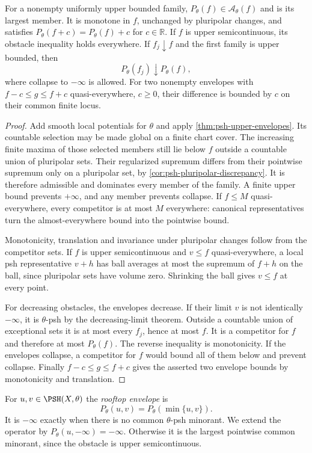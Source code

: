\begin{proposition}\label{prop:obstacle-envelope-maximal-member}
For a nonempty uniformly upper bounded family, $P_\theta(f)\in\mathcal A_\theta(f)$ and is its largest member. It is monotone in $f$, unchanged by pluripolar changes, and satisfies $P_\theta(f+c)=P_\theta(f)+c$ for $c\in\mathbb R$. If $f$ is upper semicontinuous, its obstacle inequality holds everywhere. If $f_j\downarrow f$ and the first family is upper bounded, then
\[
 P_\theta(f_j)\downarrow P_\theta(f),
\]
where collapse to $-\infty$ is allowed. For two nonempty envelopes with $f-c\leq g\leq f+c$ quasi-everywhere, $c\geq0$, their difference is bounded by $c$ on their common finite locus.
\end{proposition}
\begin{proof}
Add smooth local potentials for $\theta$ and apply \cref{thm:psh-upper-envelopes}. Its countable selection may be made global on a finite chart cover. The increasing finite maxima of those selected members still lie below $f$ outside a countable union of pluripolar sets. Their regularized supremum differs from their pointwise supremum only on a pluripolar set, by \cref{cor:psh-pluripolar-discrepancy}. It is therefore admissible and dominates every member of the family. A finite upper bound prevents $+\infty$, and any member prevents collapse. If $f\leq M$ quasi-everywhere, every competitor is at most $M$ everywhere: canonical representatives turn the almost-everywhere bound into the pointwise bound.

Monotonicity, translation and invariance under pluripolar changes follow from the competitor sets. If $f$ is upper semicontinuous and $v\leq f$ quasi-everywhere, a local psh representative $v+h$ has ball averages at most the supremum of $f+h$ on the ball, since pluripolar sets have volume zero. Shrinking the ball gives $v\leq f$ at every point.

For decreasing obstacles, the envelopes decrease. If their limit $v$ is not identically $-\infty$, it is $\theta$-psh by the decreasing-limit theorem. Outside a countable union of exceptional sets it is at most every $f_j$, hence at most $f$. It is a competitor for $f$ and therefore at most $P_\theta(f)$. The reverse inequality is monotonicity. If the envelopes collapse, a competitor for $f$ would bound all of them below and prevent collapse. Finally $f-c\leq g\leq f+c$ gives the asserted two envelope bounds by monotonicity and translation.
\end{proof}

\begin{definition}\label{def:rooftop-envelope}
For $u,v\in\PSH(X,\theta)$ the \emph{rooftop envelope} is
\[
 P_\theta(u,v)=P_\theta(\min\{u,v\}).
\]
It is $-\infty$ exactly when there is no common $\theta$-psh minorant. We extend the operator by $P_\theta(u,-\infty)=-\infty$. Otherwise it is the largest pointwise common minorant, since the obstacle is upper semicontinuous.
\end{definition}

